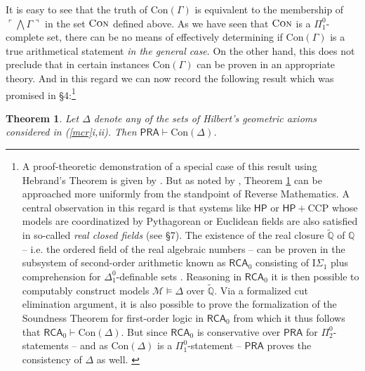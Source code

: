 \documentclass[11pt,fleqn,leqno]{article}
\newtheorem{theorem}{Theorem}[section]
\def\proves{\vdash}
\begin{document}
It is easy to see that the truth of $\mathrm{Con}(\Gamma)$ is equivalent to the membership of $\ulcorner \bigwedge \Gamma \urcorner$ in the set $\textsc{Con}$ defined above.   As we have seen that $\textsc{Con}$ is a $\Pi^0_1$-complete set, there can be no means of effectively determining if $\mathrm{Con}(\Gamma)$ is a true arithmetical statement \textsl{in the general case}.   On the other hand, this does not preclude that in certain instances $\mathrm{Con}(\Gamma)$ can be proven in an appropriate theory.   And in this regard we can now record the following result which was promised in \S 4:\footnote{A proof-theoretic demonstration of a special case of this result using Hebrand's Theorem is given by \citet{Beeson2015}.  But as noted by \citet[10.3.4]{Baldwin2018}, Theorem \ref{congeo} can be approached more uniformly from the standpoint of Reverse Mathematics.  A central observation in this regard is that systems like $\mathsf{HP}$ or $\mathsf{HP} + \mathrm{CCP}$ whose models are coordinatized by Pythagorean or Euclidean fields are also satisfied in so-called \textsl{real closed fields} (see \S 7).  The existence of the real closure $\widetilde{\mathbb{Q}}$ of $\mathbb{Q}$ -- i.e. the ordered field of the real algebraic numbers -- can be proven in the subsystem of second-order arithmetic known as $\mathsf{RCA}_0$ consisting of $\mathrm{I}\Sigma_1$ plus comprehension for $\Delta^0_1$-definable sets \citep[II.9.7]{Simpson2009}.   Reasoning in $\mathsf{RCA}_0$ it is then possible to computably construct models $\mathcal{M} \models \Delta$ over $\widetilde{\mathbb{Q}}$.  Via a formalized cut elimination argument, it is also possible to prove the formalization of the Soundness Theorem for first-order logic in $\mathsf{RCA}_0$ \citep[II.8.8]{Simpson2009} from which it thus follows that $\mathsf{RCA}_0 \proves \mathrm{Con}(\Delta)$.  But since $\mathsf{RCA}_0$ is conservative over $\mathsf{PRA}$ for $\Pi^0_2$-statements \citep[IX.1.11]{Simpson2009} -- and as $\mathrm{Con}(\Delta)$ is a $\Pi^0_1$-statement -- $\mathsf{PRA}$ proves the consistency of $\Delta$ as well.  \label{congeonote}} 
\begin{theorem} \label{congeo}  Let $\Delta$ denote any of the sets of Hilbert's geometric axioms considered in \textnormal{(\ref{mcr}i,ii)}.    Then $\mathsf{PRA} \proves \mathrm{Con}(\Delta)$.
\end{theorem}
\end{document}
